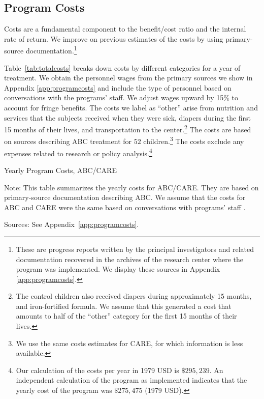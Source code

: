 \subsection{Program Costs} \label{section:programscosts}

Costs are a fundamental component to the benefit/cost ratio and the internal rate of return. We improve on previous estimates of the costs by using primary-source documentation.\footnote{These are progress reports written by the principal investigators and related documentation recovered in the archives of the research center where the program was implemented. We display these sources in Appendix \ref{app:programcosts}.}

Table~\ref{tab:totalcosts} breaks down costs by different categories for a year of treatment. We obtain the personnel wages from the primary sources we show in Appendix \ref{app:programcosts} and include the type of personnel based on conversations with the programs' staff. We adjust wages upward by 15\% to account for fringe benefits. The costs we label as ``other'' arise from nutrition and services that the subjects received when they were sick, diapers during the first 15 months of their lives, and transportation to the center.\footnote{The control children also received diapers during approximately 15 months, and iron-fortified formula. We assume that this generated a cost that amounts to half of the ``other'' category for the first 15 months of their lives.} The costs are based on sources describing ABC treatment for $52$ children.\footnote{We use the same costs estimates for CARE, for which information is less available.} The costs exclude any expenses related to research or policy analysis.\footnote{Our calculation of the costs per year in 1979 USD is $\$295,239$. An independent calculation of the program as implemented indicates that the yearly cost of the program was $\$275,475$  (1979 USD).}

\begin{table}[H]
\begin{threeparttable}
\caption{Yearly Program Costs, ABC/CARE} \label{tab:totalcosts}
\footnotesize

\begin{tablenotes}
\footnotesize
\item Note: This table summarizes the yearly costs for ABC/CARE. They are based on primary-source documentation describing ABC. We assume that the costs for ABC and CARE were the same based on conversations with programs' staff \citep{projectcare2014interviews,abc2014-2015interviews}. \\
\item Sources: See Appendix~\ref{app:programcosts}.
\end{tablenotes}
\end{threeparttable}
\end{table}

